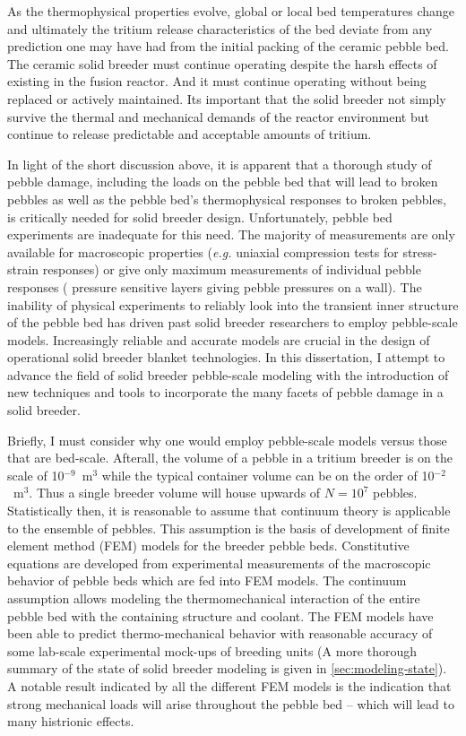 As the thermophysical properties evolve, global or local bed temperatures change and ultimately the tritium release characteristics of the bed deviate from any prediction one may have had from the initial packing of the ceramic pebble bed. The ceramic solid breeder must continue operating despite the harsh effects of existing in the fusion reactor. And it must continue operating without being replaced or actively maintained. Its important that the solid breeder not simply survive the thermal and mechanical demands of the reactor environment but continue to release predictable and acceptable amounts of tritium. 

In light of the short discussion above, it is apparent that a thorough study of pebble damage, including the loads on the pebble bed that will lead to broken pebbles as well as the pebble bed's thermophysical responses to broken pebbles, is critically needed for solid breeder design. Unfortunately, pebble bed experiments are inadequate for this need. The majority of measurements are only available for macroscopic properties (\textit{e.g.} uniaxial compression tests for stress-strain responses) or give only maximum measurements of individual pebble responses ( pressure sensitive layers giving pebble pressures on a wall). The inability of physical experiments to reliably look into the transient inner structure of the pebble bed has driven past solid breeder researchers to employ pebble-scale models. Increasingly reliable and accurate models are crucial in the design of operational solid breeder blanket technologies. In this dissertation, I attempt to advance the field of solid breeder pebble-scale modeling with the introduction of new techniques and tools to incorporate the many facets of pebble damage in a solid breeder.

Briefly, I must consider why one would employ pebble-scale models versus those that are bed-scale. Afterall, the volume of a pebble in a tritium breeder is on the scale of 10$^{-9}$~m$^3$ while the typical container volume can be on the order of 10$^{-2}$~m$^3$\cite{Cho2008}.  Thus a single breeder volume will house upwards of $N = 10^7$ pebbles. Statistically then, it is reasonable to assume that continuum theory is applicable to the ensemble of pebbles. This assumption is the basis of development of finite element method (FEM) models for the breeder pebble beds. Constitutive equations are developed from experimental measurements of the macroscopic behavior of pebble beds which are fed into FEM models. The continuum assumption allows modeling the thermomechanical interaction of the entire pebble bed with the containing structure and coolant. The FEM models have been able to predict thermo-mechanical behavior with reasonable accuracy of some lab-scale experimental mock-ups of breeding units (A more thorough summary of the state of solid breeder modeling is given in \cref{sec:modeling-state}).\cite{DiMaio20081287,Zaccari20081282,Gan:2009vn} A notable result indicated by all the different FEM models is the indication that strong mechanical loads will arise throughout the pebble bed -- which will lead to many histrionic effects. 

